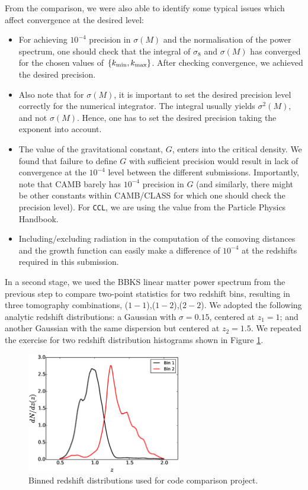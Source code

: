 \documentclass[\docopts]{\docclass}
\begin{document}
From the comparison, we were also able to identify some typical issues which affect convergence at the desired level:
\begin{itemize}
\item For achieving $10^{-4}$ precision in $\sigma(M)$ and the normalisation of the power spectrum, one should check that the integral of $\sigma_8$ and $\sigma(M)$ has converged for the chosen values of $\{k_{\rm min},k_{\rm max}\}$. After checking convergence, we achieved the desired precision.
\item Also note that for $\sigma(M)$, it is important to set the desired precision level correctly for the numerical integrator. The integral usually yields $\sigma^2(M)$, and not $\sigma(M)$. Hence, one has to set the desired precision taking the exponent into account.
\item The value of the gravitational constant, $G$, enters into the critical density. We found that failure to define $G$ with sufficient precision would result in lack of convergence at the $10^{-4}$ level between the different submissions. Importantly, note that CAMB barely has $10^{-4}$ precision in $G$ (and similarly, there might be other constants within CAMB/CLASS for which one should check the precision level). For {\tt CCL}, we are using the value from the Particle Physics Handbook. %
\item Including/excluding radiation in the computation of the comoving distances and the growth function can easily make a difference of $10^{-4}$ at the redshifts required in this submission.
\end{itemize}

In a second stage, we used the BBKS linear matter power spectrum from the previous step to compare two-point statistics for two redshift bins, resulting in three tomography combinations, ($1-1$),($1-2$),($2-2$). We adopted the following analytic redshift distributions: a Gaussian with $\sigma = 0.15$, centered at $z_1 = 1$; and another Gaussian with the same dispersion but centered at $z_2 = 1.5$. We repeated the exercise for two redshift distribution histograms shown in Figure \ref{fig:zhistos}. 

\begin{figure}
\centering
\includegraphics[width=0.6\textwidth]{zdist.eps}
\caption{Binned redshift distributions used for code comparison project.}
\label{fig:zhistos}
\end{figure}
\end{document}
